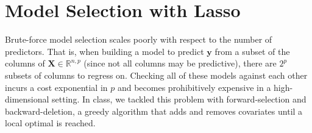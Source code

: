 \documentclass[letterpaper, 12pt]{article}
\newcommand{\bX}{\bm X}
\begin{document}
\section{Model Selection with Lasso}

Brute-force model selection scales poorly with respect to the number of
predictors. That is, when building a model to predict $\bm{y}$ from a subset of
the columns of $\bX \in \mathbb{R}^{n,p}$ (since not all columns may be
predictive), there are $2^p$ subsets of columns to regress on. Checking all of
these models against each other incurs a cost exponential in $p$ and becomes
prohibitively expensive in a high-dimensional setting. In class, we tackled this problem with forward-selection and backward-deletion,
a greedy algorithm that adds and removes covariates until a local optimal is
reached. 
\end{document}
